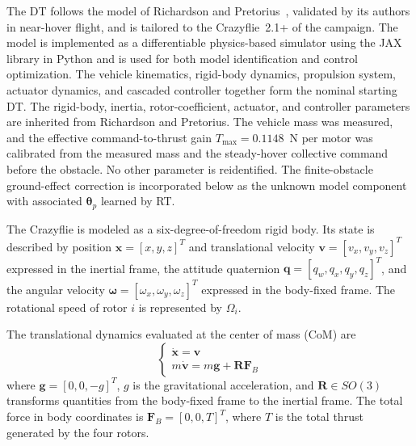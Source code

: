\documentclass[journal]{IEEEtran}
\begin{document}
The DT follows the model of Richardson and Pretorius~\cite{Richardson2025}, validated by its authors in near-hover flight, and is tailored to the Crazyflie~2.1+ of the campaign. The model is implemented as a differentiable physics-based simulator using the JAX library in Python and is used for both model identification and control optimization. The vehicle kinematics, rigid-body dynamics, propulsion system, actuator dynamics, and cascaded controller together form the nominal starting DT. The rigid-body, inertia, rotor-coefficient, actuator, and controller parameters are inherited from Richardson and Pretorius. The vehicle mass was measured, and the effective command-to-thrust gain $T_{\max}=0.1148$~N per motor was calibrated from the measured mass and the steady-hover collective command before the obstacle. No other parameter is reidentified. The finite-obstacle ground-effect correction is incorporated below as the unknown model component with associated $\boldsymbol{\theta}_p$ learned by RT.

The Crazyflie is modeled as a six-degree-of-freedom rigid body. Its state is described by position $\mathbf{x}=[x,y,z]^T$ and translational velocity $\mathbf{v}=[v_x,v_y,v_z]^T$ expressed in the inertial frame, the attitude quaternion $\mathbf{q}=[q_w,q_x,q_y,q_z]^T$, and the angular velocity $\boldsymbol{\omega}=[\omega_x,\omega_y,\omega_z]^T$ expressed in the body-fixed frame. The rotational speed of rotor $i$ is represented by $\Omega_i$.

The translational dynamics evaluated at the center of mass (CoM) are
%
\begin{equation}
\begin{cases}
{\dot{\mathbf{x}}=\mathbf{v}}\\
{m\dot{\mathbf{v}}=m\mathbf{g}+\mathbf{R}\mathbf{F}_{B}}
\end{cases}
\label{eq_vehicle_trasl}
\end{equation}
where $\mathbf{g}=[0,0,-g]^T$, $g$ is the gravitational acceleration, and $\mathbf{R}\in SO(3)$ transforms quantities from the body-fixed frame to the inertial frame. The total force in body coordinates is $\mathbf{F}_{B}=[0,0,T]^T$, where $T$ is the total thrust generated by the four rotors.
%
\end{document}
